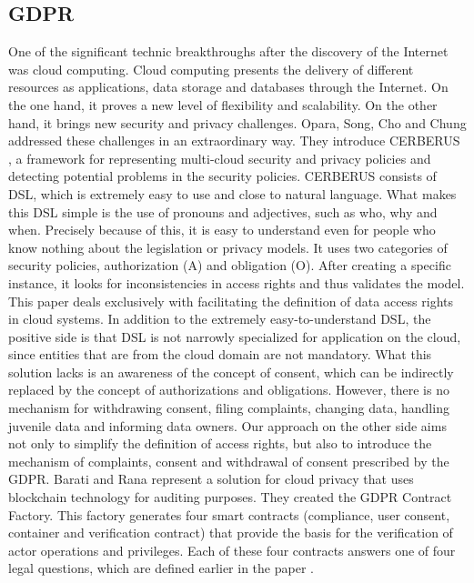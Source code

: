 \documentclass[11pt,english]{article}
\begin{document}
\subsection{GDPR}
One of the significant technic breakthroughs after the discovery of the Internet was cloud computing. Cloud computing presents the delivery of different resources as applications, data storage and databases through the Internet. On the one hand, it proves a new level of flexibility and scalability. On the other hand, it brings new security and privacy challenges. \newline Opara, Song, Cho and Chung addressed these challenges in an extraordinary way. They introduce CERBERUS \cite{opara2019representing}, a framework for representing multi-cloud security and privacy policies and detecting potential problems in the security policies. CERBERUS consists of DSL, which is extremely easy to use and close to natural language. What makes this DSL simple is the use of pronouns and adjectives, such as who, why and when. Precisely because of this, it is easy to understand even for people who know nothing about the legislation or privacy models. It uses two categories of security policies, authorization (A) and obligation (O). After creating a specific instance, it looks for inconsistencies in access rights and thus validates the model. This paper deals exclusively with facilitating the definition of data access rights in cloud systems. In addition to the extremely easy-to-understand DSL, the positive side is that DSL is not narrowly specialized for application on the cloud, since entities that are from the cloud domain are not mandatory. What this solution lacks is an awareness of the concept of consent, which can be indirectly replaced by the concept of authorizations and obligations.  However, there is no mechanism for withdrawing consent, filing complaints, changing data, handling juvenile data and informing data owners. Our approach on the other side aims not only to simplify the definition of access rights, but also to introduce the mechanism of complaints, consent and withdrawal of consent prescribed by the GDPR. Barati and Rana \cite{barati2020tracking} represent a solution for cloud privacy that uses blockchain technology for auditing purposes. They created the GDPR Contract Factory. This factory generates four smart contracts (compliance, user consent, container and veriﬁcation contract) that provide the basis for the veriﬁcation of actor operations and privileges. Each of these four contracts answers one of four legal questions, which are defined earlier in the paper \cite{corrales2018smart}. 
\end{document}
